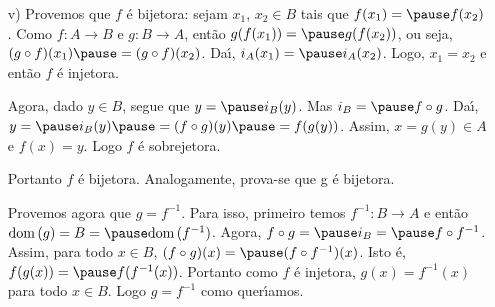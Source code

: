\documentclass{beamer}
\begin{document}
    \begin{frame}
        \begin{enumerate}
            \item[v)] Provemos que $f$ \'e bijetora: \pause sejam $x_1$, \pause $x_2 \in B$ \pause tais que $f(x_1) = \pause f(x_2)$. \pause Como $f : A \to B$ \pause e $g : B \to A$, \pause ent{\~a}o $g(f(x_1)) = \pause g(f(x_2))$, \pause ou seja, \pause $(g\circ f)(x_1) \pause = (g\circ f)(x_2)$. \pause Da{\'\i}, $i_{A}(x_1) = \pause i_{A}(x_2)$. \pause Logo, \pause $x_1 = x_2$ \pause \linebreak e então $f$ {\'e} injetora.\pause

            \vspace{.3cm}

            Agora, dado $y \in B$, \pause segue que $y = \pause i_{B}(y)$. \pause Mas $i_{B} = \pause f\circ g$. \pause Da{\'\i}, \pause $y = \pause i_{B}(y) \pause = (f\circ g)(y) \pause = f(g(y))$. \pause Assim, \pause $x = g(y) \in A$ \pause e $f(x) = y$. \pause Logo $f$ {\'e} sobrejetora.\pause

            \vspace{.3cm}

            Portanto $f$ {\'e} bijetora. \pause Analogamente, prova-se que g {\'e} bijetora.\pause

            \vspace{.3cm}

            Provemos agora que \pause $g = f^{-1}$. \pause Para isso, \pause primeiro temos \linebreak $f^{-1} : B \to A$ \pause e ent\~ao $\dom(g) = B = \pause \dom(f^{-1})$. \pause Agora, $f\circ g = \pause i_{B} = \pause f\circ f^{-1}$. \pause Assim, para todo $x \in B$, \pause $(f\circ g)(x) = \pause (f\circ f^{-1})(x)$. \pause Isto {\'e}, \pause $f(g(x)) = \pause f(f^{-1}(x))$. \pause Portanto como $f$ \'e injetora, \pause $g(x) = f^{-1}(x)$ \pause para todo $x \in B$. \pause Logo $g = f^{-1}$ \pause como quer{\'\i}amos.\pause \hspace{.5cm} \qedsymbol
        \end{enumerate}
    \end{frame}
\end{document}
